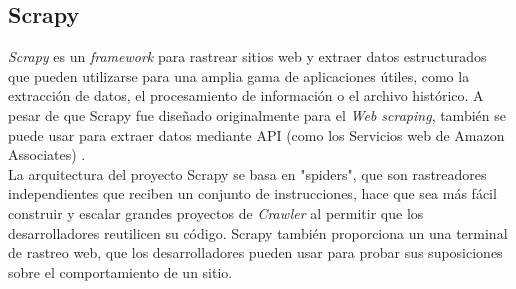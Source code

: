 
\subsection{Scrapy}
\textit{Scrapy} es un \textit{framework} para rastrear sitios web y extraer datos estructurados que pueden utilizarse para una amplia 
gama de aplicaciones útiles, como la extracción de datos, el procesamiento de información o el archivo histórico.
A pesar de que Scrapy fue diseñado originalmente para el \textit{Web scraping}, también se puede usar para extraer datos mediante 
API (como los Servicios web de Amazon Associates) \citep{CTScrapy}.\\

La arquitectura del proyecto Scrapy se basa en "spiders", que son rastreadores independientes que reciben un conjunto de instrucciones,
hace que sea más fácil construir y escalar grandes proyectos de \textit{Crawler} al permitir que los desarrolladores reutilicen su 
código. Scrapy también proporciona un una terminal de rastreo web, que los desarrolladores pueden usar para probar sus suposiciones 
sobre el comportamiento de un sitio.
